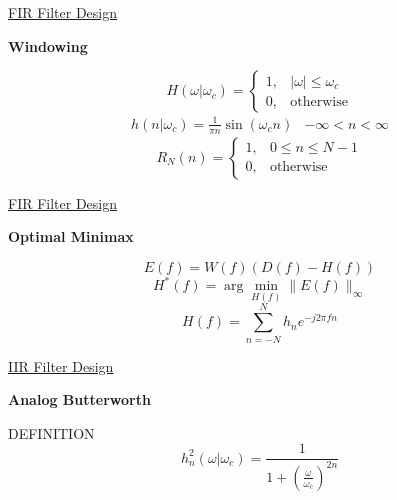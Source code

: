 \begin{slide}
{}
{\tiny\underline{FIR Filter Design}}
\begin{center}
{\bf Windowing}
\end{center}
\vfill
\vbox{
{\tiny
%
$$
H(\omega|\omega_c)=\left\{ \begin{array}{ll}
                     1, & \mbox{$|\omega|\leq\omega_c$}\\
                     0, & \mbox{otherwise}
                \end{array}
       \right.
$$
%
\vfil
%
$$
\begin{array}{cc}
h(n|\omega_c)=\frac{1}{\pi n}\sin(\omega_cn) &   -\infty<n<\infty
\end{array}
$$
%
\vfil
%
$$
R_N(n)=\left\{ \begin{array}{ll}
                     1, & \mbox{$0 \leq n \leq N-1$}\\
                     0, & \mbox{otherwise}
                \end{array}
       \right.
$$
%
}}
\vfill
\vbox{
}
\vfill
\end{slide}
\begin{slide}
{}
{\tiny\underline{FIR Filter Design}}
\begin{center}
{\bf Optimal Minimax}
\end{center}
\vfill
\vbox{
{\tiny
%
$$
E(f)=W(f)(D(f)-H(f))
$$
%
\vfil
%
$$
H^*(f)=\arg \min_{H(f)}\|E(f)\|_{\infty}
$$
%
\vfil
%
$$
H(f)=\sum_{n=-N}^{N}h_n e^{-j2\pi fn}
$$
%
}}
\vfill
\vbox{
}
\vfill
\end{slide}
\begin{slide}
{}
{\tiny\underline{IIR Filter Design}}
\begin{center}
{\bf Analog Butterworth}
\end{center}
\vfill
\vbox{
{\tiny
DEFINITION
%
$$
h_n^2(\omega \vert \omega_c)=\frac{1}{1+{(\frac{\omega}{ \omega_c})}^{2n}}
$$
%
}}
\vfill
\vbox{
}
\vfill
\end{slide}
